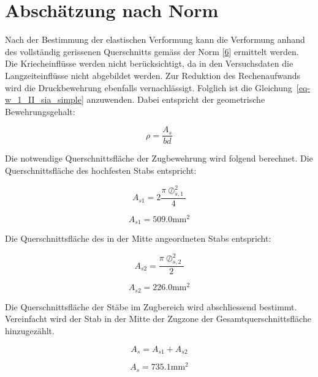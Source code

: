 \documentclass[
  12pt,
  letterpaper,
  egregdoesnotlikesansseriftitles]{scrreprt}
\begin{document}
\hypertarget{abschuxe4tzung-nach-norm-1}{%
\section{Abschätzung nach Norm}\label{abschuxe4tzung-nach-norm-1}}

Nach der Bestimmung der elastischen Verformung kann die Verformung
anhand des vollständig gerissenen Querschnitts gemäss der Norm
{[}\protect\hyperlink{ref-SIA2013a}{6}{]} ermittelt werden. Die
Kriecheinflüsse werden nicht berücksichtigt, da in den Versuchsdaten die
Langzeiteinflüsse nicht abgebildet werden. Zur Reduktion des
Rechenaufwands wird die Druckbewehrung ebenfalls vernachlässigt.
Folglich ist die Gleichung~\ref{eq-w_1_II_sia_simple} anzuwenden. Dabei
entspricht der geometrische Bewehrungsgehalt:

\begin{equation}\rho = \frac{A_{s}}{b d}\end{equation}

Die notwendige Querschnittsfläche der Zugbewehrung wird folgend
berechnet. Die Querschnittsfläche des hochfesten Stabs entspricht:

\begin{equation}A_{s 1} = 2 \frac{\pi \oslash_{s,1}^{2}}{4}\end{equation}

\begin{equation}A_{s 1} = 509.0 \text{mm}^{2}\end{equation}

Die Querschnittsfläche des in der Mitte angeordneten Stabs entspricht:

\begin{equation}A_{s 2} = \frac{\pi \oslash_{s,2}^{2}}{2}\end{equation}

\begin{equation}A_{s 2} = 226.0 \text{mm}^{2}\end{equation}

Die Querschnittsfläche der Stäbe im Zugbereich wird abschliessend
bestimmt. Vereinfacht wird der Stab in der Mitte der Zugzone der
Gesamtquerschnittsfläche hinzugezählt.

\begin{equation}A_{s} = A_{s 1} + A_{s 2}\end{equation}

\begin{equation}A_{s} = 735.1 \text{mm}^{2}\end{equation}
\end{document}
